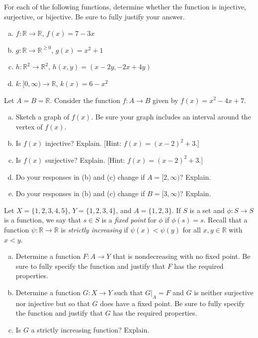 \documentclass[11pt,letterpaper]{article}
\begin{document}

 For each of the following functions, determine whether the function is injective, surjective, or bijective. Be sure to fully justify your answer.
	\begin{enumerate}[(a)]
	\item $f: \mathbb{R} \to \mathbb{R}$, $f(x)= 7 - 3x$
	\item $g: \mathbb{R} \to \mathbb{R}^{\geq 0}$, $g(x)= x^2 + 1$
	\item $h: \mathbb{R}^2 \to \mathbb{R}^2$, $h(x, y)= (x - 2y, -2x + 4y)$
	\item $k: [0, \infty) \to \mathbb{R}$, $k(x)= 6 - x^2$
	\end{enumerate}



\newpage



 Let $A= B= \mathbb{R}$. Consider the function $f: A \to B$ given by $f(x)= x^2 - 4x + 7$.
	\begin{enumerate}[(a)]
	\item Sketch a graph of $f(x)$. Be sure your graph includes an interval around the vertex of $f(x)$.
	\item Is $f(x)$ injective? Explain. [Hint: $f(x)= (x - 2)^2 + 3$.]
	\item Is $f(x)$ surjective? Explain. [Hint: $f(x)= (x - 2)^2 + 3$.]
	\item Do your responses in (b) and (c) change if $A= [2, \infty)$? Explain. 
	\item Do your responses in (b) and (c) change if $B= [3, \infty)$? Explain. 
	\end{enumerate}



\newpage



 Let $X= \{ 1, 2, 3, 4, 5 \}$, $Y= \{ 1, 2, 3, 4 \}$, and $A= \{ 1, 2, 3 \}$. If $S$ is a set and $\phi: S \to S$ is a function, we say that $s \in S$ is a \textit{fixed point} for $\phi$ if $\phi(s)= s$. Recall that a function $\psi: \mathbb{R} \to \mathbb{R}$ is \textit{strictly increasing} if $\psi(x) < \psi(y)$ for all $x, y \in \mathbb{R}$ with $x < y$.
	\begin{enumerate}[(a)]
	\item Determine a function $F: A \to Y$ that is nondecreasing with no fixed point. Be sure to fully specify the function and justify that $F$ has the required properties. 
	\item Determine a function $G: X \to Y$ such that $G \big|_A= F$ and $G$ is neither surjective nor injective but so that $G$ does have a fixed point. Be sure to fully specify the function and justify that $G$ has the required properties. 
	\item Is $G$ a strictly increasing function? Explain. 
	\end{enumerate}
\end{document}
